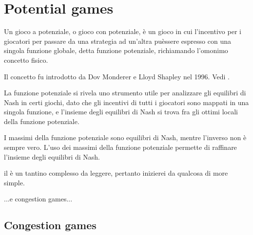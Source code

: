 \chapter{Potential games}
Un gioco a potenziale, o gioco con potenziale, \`e un gioco in cui l'incentivo per i giocatori per passare da una strategia ad un'altra pu\` essere espresso con una singola funzione globale, detta funzione potenziale, richiamando l'omonimo concetto fisico.

Il concetto fu introdotto da Dov Monderer e Lloyd Shapley nel 1996. Vedi \cite{2}.

La funzione potenziale si rivela uno strumento utile per analizzare gli equilibri di Nash in certi giochi, dato che gli incentivi di tutti i giocatori sono mappati in una singola funzione, e l'insieme degli equilibri di Nash si trova fra gli ottimi locali della funzione potenziale.

I massimi della funzione potenziale sono equilibri di Nash, mentre l'inverso non \`e sempre vero. L'uso dei massimi della funzione potenziale permette di raffinare l'insieme degli equilibri di Nash.


il \cite{2} \`e un tantino complesso da leggere, pertanto inizierei da qualcosa di more simple.

...e congestion games...

\section{Congestion games}

